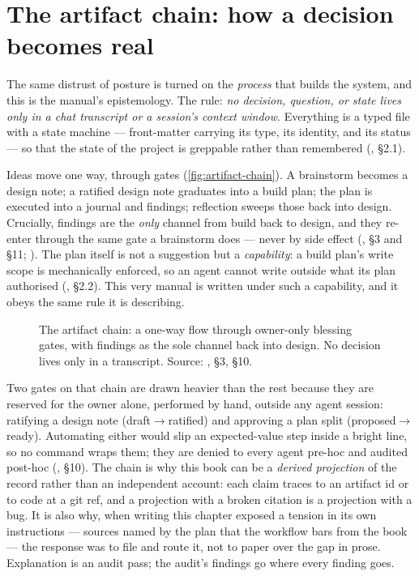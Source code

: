 \section{The artifact chain: how a decision becomes real}
\label{sec:artifact-chain}

The same distrust of posture is turned on the \emph{process} that builds the
system, and this is the manual's epistemology. The rule: \emph{no decision,
question, or state lives only in a chat transcript or a session's context window}.
Everything is a typed file with a state machine --- front-matter carrying its type,
its identity, and its status --- so that the state of the project is greppable
rather than remembered (, \S 2.1).

Ideas move one way, through gates (\autoref{fig:artifact-chain}). A brainstorm
becomes a design note; a ratified design note graduates into a build plan; the plan
is executed into a journal and findings; reflection sweeps those back into design.
Crucially, findings are the \emph{only} channel from build back to design, and they
re-enter through the same gate a brainstorm does --- never by side effect
(, \S 3 and \S 11; ). The
plan itself is not a suggestion but a \emph{capability}: a build plan's write scope
is mechanically enforced, so an agent cannot write outside what its plan authorised
(, \S 2.2). This very manual is written under such a
capability, and it obeys the same rule it is describing.

\begin{figure}[t]
  \centering
  
  \caption[The artifact chain]{The artifact chain: a one-way flow through owner-only
    blessing gates, with findings as the sole channel back into design. No decision
    lives only in a transcript. Source: , \S 3, \S 10.}
  \label{fig:artifact-chain}
\end{figure}

Two gates on that chain are drawn heavier than the rest because they are reserved
for the owner alone, performed by hand, outside any agent session: ratifying a
design note (\textsf{draft}$\to$\textsf{ratified}) and approving a plan split
(\textsf{proposed}$\to$\textsf{ready}). Automating either would slip an
expected-value step inside a bright line, so no command wraps them; they are denied
to every agent pre-hoc and audited post-hoc (, \S 10).
The chain is why this book can be a \emph{derived projection} of the record rather
than an independent account: each claim traces to an artifact id or to code at a
git ref, and a projection with a broken citation is a projection with a bug. It is
also why, when writing this chapter exposed a tension in its own instructions ---
sources named by the plan that the workflow bars from the book --- the response was
to file  and route it, not to paper over the gap in prose.
Explanation is an audit pass; the audit's findings go where every finding goes.


